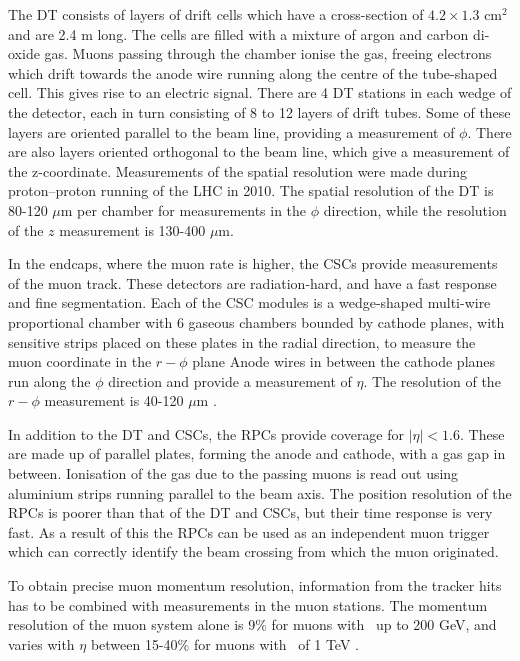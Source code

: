 The \ac{DT} consists of layers of drift cells which have a cross-section of $4.2 \times 1.3$ cm$^2$ and
are 2.4 m long. The cells are filled with a mixture of %
argon and carbon di-oxide gas.
Muons passing through the chamber ionise the gas, freeing electrons
which drift towards the anode wire running along the centre of the tube-shaped cell. 
This gives rise to an electric signal. There are 4 \ac{DT} stations in each wedge of 
the detector, each in turn consisting of 8 to 12 layers of drift tubes. Some of
these layers are oriented parallel to the beam line, providing a measurement of $\phi$.
There are also layers oriented orthogonal to the beam line, which give a measurement
of the z-coordinate. Measurements of the spatial resolution were made
during proton--proton running of the \ac{LHC} in 2010.
The spatial resolution of the \ac{DT} is 80-120 $\mu$m per chamber for
measurements in the $\phi$ direction, while the resolution of the $z$ measurement
is 130-400 $\mu$m\cite{cms-muon-7tev}.

In the endcaps, where the muon rate is higher, the \ac{CSCs} provide
measurements of the muon track. These detectors are radiation-hard,
and have a fast response and fine segmentation.
Each of the CSC modules is a wedge-shaped
multi-wire proportional chamber %
with 6 gaseous chambers bounded by cathode planes, with
sensitive strips placed on these plates in the
radial direction, to measure the muon coordinate in the  $r-\phi$ plane
Anode wires in between the cathode planes
run along the $\phi$ direction and provide a measurement of
$\eta$. The resolution of the $r-\phi$ measurement is 40-120 $\mu$m \cite{cms-muon-7tev}.

In addition to the \ac{DT} and \ac{CSCs}, the \ac{RPCs} provide coverage
for $|\eta|<1.6$. These are made up of parallel plates, forming the anode and cathode,
with a gas gap in between. Ionisation of the gas due to the passing
muons is read out using aluminium strips running parallel to the 
beam axis. The position resolution of the \ac{RPCs} is poorer than
that of the \ac{DT} and \ac{CSCs}, but their time response is very fast. As
a result of this the \ac{RPCs} can be used as an independent muon trigger
which can correctly identify the beam crossing from which the muon
originated.

To obtain precise muon momentum resolution, information from 
the tracker hits has to be combined with measurements in the
muon stations. The momentum resolution of the muon system
alone is 9\% for muons with \pT~up to 200 GeV, and varies with $\eta$ 
between 15-40\% for muons with \pT~of 1 TeV \cite{cms-jinst}.


